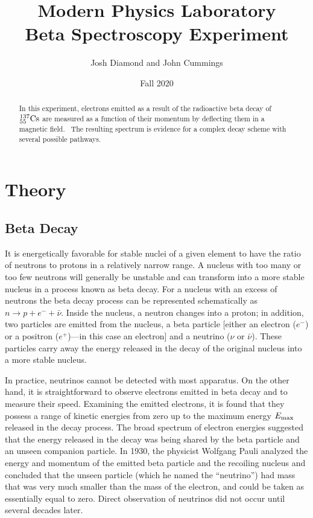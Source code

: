 \documentclass{article}
\newcommand{\cs}{${}^{137}_{55}{\rm Cs}$ }
\begin{document}
\title{Modern Physics Laboratory\\
Beta Spectroscopy Experiment}
\author{Josh Diamond and John Cummings}
\date{Fall 2020}
\maketitle

\begin{abstract}
In this experiment, electrons emitted as a result of the radioactive
beta decay of \cs are measured as a function of their momentum by
deflecting them in a magnetic field. \ The resulting spectrum is
evidence for a complex decay scheme with several possible pathways.
\end{abstract}



\section{Theory}
\subsection{Beta Decay}

It is energetically favorable for stable nuclei of a given element to
have the ratio of neutrons to protons in a relatively narrow range.  A
nucleus with too many or too few neutrons will generally be unstable
and can transform into a more stable nucleus in a process known as beta
decay.  For a nucleus with an excess of neutrons the beta decay
process can be represented schematically as $n \to p + e^- + \bar{\nu}$.
Inside the nucleus, a neutron changes into a proton; in addition,
two particles are emitted from the nucleus, a beta particle [either an
electron ($e^-$) or a positron
($e^+$)---in this case an electron]
and a neutrino ($\nu$ or $\bar{\nu}$).  These particles carry
away the energy released in the decay of the original nucleus into a
more stable nucleus.

In practice, neutrinos cannot be detected with most apparatus.
On the other hand, it is straightforward to observe electrons emitted
in beta decay and to measure their speed. Examining the emitted
electrons, it is found that they possess a range of kinetic energies
from zero up to the maximum energy
$E_{\rm max}$ released in the decay process.
The broad spectrum of electron energies suggested that the energy
released in the decay was being shared by the beta particle and an
unseen companion particle.  In 1930, the physicist Wolfgang Pauli
analyzed the energy and momentum of the emitted beta particle and the
recoiling nucleus and concluded that the unseen particle (which he
named the ``neutrino'') had mass that was
very much smaller than the mass of the electron, and could be taken as
essentially equal to zero.  Direct observation of neutrinos did not
occur until several decades later.
\end{document}
